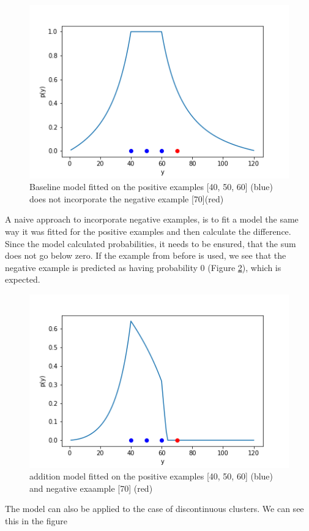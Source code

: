 \documentclass[12pt, ]{scrartcl}
\begin{document}
\begin{multicols}{2}
\begin{figure}[H]
	\includegraphics[scale=0.5]{graphics/baseline.png}
	\caption{Baseline model fitted on the positive examples [40, 50, 60] (blue) does not incorporate the negative example [70](red) }
	\label{fig:baseline}
\end{figure}

A naive approach to incorporate negative examples, is to fit a model the same way it was fitted for the positive examples and then calculate the difference.
Since the model calculated probabilities, it needs to be ensured, that the sum does not go below zero. 
If the example from before is used, we see that the negative example is predicted as having probability 0 (Figure \ref{fig:add}), which is expected.

\begin{figure}[H]
	\includegraphics[scale=0.5]{graphics/addition_model}
	\caption{addition model fitted on the positive examples [40, 50, 60] (blue) and negative exaample [70] (red)}
	\label{fig:add}
\end{figure}
\noindent
The model can also be applied to the case of discontinuous clusters. We can see this in the figure


\end{multicols}
\end{document}
